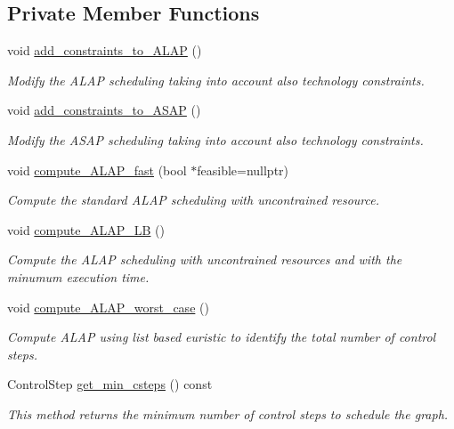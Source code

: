 \subsection*{Private Member Functions}
\begin{DoxyCompactItemize}
\item 
void \hyperlink{classASLAP_a3ab73e853dc4b3286cc1e4d76e6e313d}{add\+\_\+constraints\+\_\+to\+\_\+\+A\+L\+AP} ()
\begin{DoxyCompactList}\small\item\em Modify the A\+L\+AP scheduling taking into account also technology constraints. \end{DoxyCompactList}\item 
void \hyperlink{classASLAP_a1329f2184152a6e5d403a3d82c2a0ca0}{add\+\_\+constraints\+\_\+to\+\_\+\+A\+S\+AP} ()
\begin{DoxyCompactList}\small\item\em Modify the A\+S\+AP scheduling taking into account also technology constraints. \end{DoxyCompactList}\item 
void \hyperlink{classASLAP_a6baa077e9e86116db4997b1a65e891fc}{compute\+\_\+\+A\+L\+A\+P\+\_\+fast} (bool $\ast$feasible=nullptr)
\begin{DoxyCompactList}\small\item\em Compute the standard A\+L\+AP scheduling with uncontrained resource. \end{DoxyCompactList}\item 
void \hyperlink{classASLAP_a159cf9d0fbd60dcd9c4ba2912ea4405e}{compute\+\_\+\+A\+L\+A\+P\+\_\+\+LB} ()
\begin{DoxyCompactList}\small\item\em Compute the A\+L\+AP scheduling with uncontrained resources and with the minumum execution time. \end{DoxyCompactList}\item 
void \hyperlink{classASLAP_af0ad5c5a9402cfcfd511a3c3bb4b4f6f}{compute\+\_\+\+A\+L\+A\+P\+\_\+worst\+\_\+case} ()
\begin{DoxyCompactList}\small\item\em Compute A\+L\+AP using list based euristic to identify the total number of control steps. \end{DoxyCompactList}\item 
Control\+Step \hyperlink{classASLAP_a0e18a0fc0dd7ef8148ef22c58ea342db}{get\+\_\+min\+\_\+csteps} () const
\begin{DoxyCompactList}\small\item\em This method returns the minimum number of control steps to schedule the graph. \end{DoxyCompactList}\item 

\end{DoxyCompactItemize}
